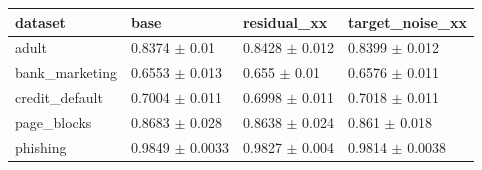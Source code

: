 \begin{tabular}{llll}
\toprule
dataset & base & residual\_xx & target\_noise\_xx \\
\midrule
adult & 0.8374 $\pm$ 0.01 & 0.8428 $\pm$ 0.012 & 0.8399 $\pm$ 0.012 \\
bank\_marketing & 0.6553 $\pm$ 0.013 & 0.655 $\pm$ 0.01 & 0.6576 $\pm$ 0.011 \\
credit\_default & 0.7004 $\pm$ 0.011 & 0.6998 $\pm$ 0.011 & 0.7018 $\pm$ 0.011 \\
page\_blocks & 0.8683 $\pm$ 0.028 & 0.8638 $\pm$ 0.024 & 0.861 $\pm$ 0.018 \\
phishing & 0.9849 $\pm$ 0.0033 & 0.9827 $\pm$ 0.004 & 0.9814 $\pm$ 0.0038 \\
\bottomrule
\end{tabular}

